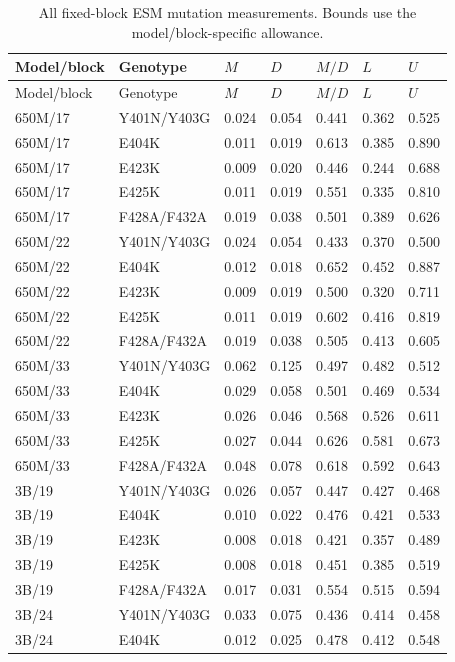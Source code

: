 \documentclass[a4paper,11pt]{scrartcl}
\begin{document}
\begingroup\small
\begin{longtable}{@{}lllllll@{}}
\caption{All fixed-block ESM mutation measurements. Bounds use the model/block-specific allowance.}\\
\toprule Model/block & Genotype & $M$ & $D$ & $M/D$ & $L$ & $U$\\\midrule\endfirsthead
\toprule Model/block & Genotype & $M$ & $D$ & $M/D$ & $L$ & $U$\\\midrule\endhead
650M/17 & Y401N/Y403G & 0.024 & 0.054 & 0.441 & 0.362 & 0.525\\
650M/17 & E404K & 0.011 & 0.019 & 0.613 & 0.385 & 0.890\\
650M/17 & E423K & 0.009 & 0.020 & 0.446 & 0.244 & 0.688\\
650M/17 & E425K & 0.011 & 0.019 & 0.551 & 0.335 & 0.810\\
650M/17 & F428A/F432A & 0.019 & 0.038 & 0.501 & 0.389 & 0.626\\
650M/22 & Y401N/Y403G & 0.024 & 0.054 & 0.433 & 0.370 & 0.500\\
650M/22 & E404K & 0.012 & 0.018 & 0.652 & 0.452 & 0.887\\
650M/22 & E423K & 0.009 & 0.019 & 0.500 & 0.320 & 0.711\\
650M/22 & E425K & 0.011 & 0.019 & 0.602 & 0.416 & 0.819\\
650M/22 & F428A/F432A & 0.019 & 0.038 & 0.505 & 0.413 & 0.605\\
650M/33 & Y401N/Y403G & 0.062 & 0.125 & 0.497 & 0.482 & 0.512\\
650M/33 & E404K & 0.029 & 0.058 & 0.501 & 0.469 & 0.534\\
650M/33 & E423K & 0.026 & 0.046 & 0.568 & 0.526 & 0.611\\
650M/33 & E425K & 0.027 & 0.044 & 0.626 & 0.581 & 0.673\\
650M/33 & F428A/F432A & 0.048 & 0.078 & 0.618 & 0.592 & 0.643\\
3B/19 & Y401N/Y403G & 0.026 & 0.057 & 0.447 & 0.427 & 0.468\\
3B/19 & E404K & 0.010 & 0.022 & 0.476 & 0.421 & 0.533\\
3B/19 & E423K & 0.008 & 0.018 & 0.421 & 0.357 & 0.489\\
3B/19 & E425K & 0.008 & 0.018 & 0.451 & 0.385 & 0.519\\
3B/19 & F428A/F432A & 0.017 & 0.031 & 0.554 & 0.515 & 0.594\\
3B/24 & Y401N/Y403G & 0.033 & 0.075 & 0.436 & 0.414 & 0.458\\
3B/24 & E404K & 0.012 & 0.025 & 0.478 & 0.412 & 0.548\\

\end{longtable}
\end{document}
